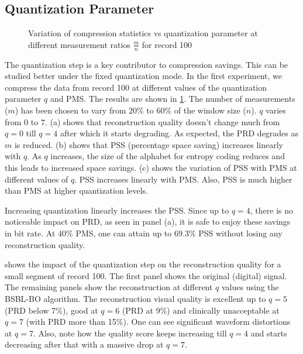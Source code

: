 \subsection{Quantization Parameter}

\begin{figure}
\centering
{}
\hfill
{}
\hfill
{}
\hfill
\caption{Variation of compression statistics vs quantization parameter
at different measurement ratios $\frac{m}{n}$
for record 100}
\label{fig-cs-codec-100-q-mr-stats}
\end{figure}


The quantization step is a key contributor to compression
savings. This can be studied better under the fixed
quantization mode. In the first experiment, we compress
the data from record 100 at different values of
the quantization parameter $q$ and PMS.
The results are shown in \cref{fig-cs-codec-100-q-mr-stats}.
The number of measurements ($m$) has been chosen to vary from
$20\%$ to $60\%$ of the window size ($n$).
$q$ varies from $0$ to $7$.
(a) shows that reconstruction quality doesn't
change much from $q=0$ till $q=4$ after which it starts degrading.
As expected, the PRD degrades as $m$ is reduced.
(b) shows that PSS (percentage space saving) increases linearly
with $q$. As $q$ increases, the size of the alphabet for
entropy coding reduces and this leads to increased space savings.
(c) shows the variation of PSS with PMS at different values of $q$.
PSS increases linearly with PMS. Also, PSS is much higher
than PMS at higher quantization levels.

Increasing quantization linearly increases the PSS.
Since up to $q=4$, there is no noticeable
impact on PRD, as seen in panel (a), it is safe
to enjoy these savings in bit rate. 
At $40\%$ PMS, one can attain up to $69.3\%$ PSS without
losing any reconstruction quality.

 shows the impact of the
quantization step on the reconstruction quality
for a small segment of record 100.
The first panel shows the original (digital) signal.
The remaining panels show the reconstruction at different $q$ values
using the BSBL-BO algorithm.
The reconstruction visual quality is excellent
up to $q=5$ (PRD below 7\%), good at $q=6$ (PRD at 9\%)
and clinically unacceptable at $q=7$
(with PRD more than 15\%).
One can see significant waveform distortions at $q=7$.
Also, note how the quality score keeps increasing till
$q=4$ and starts decreasing after that with a massive
drop at $q=7$.


